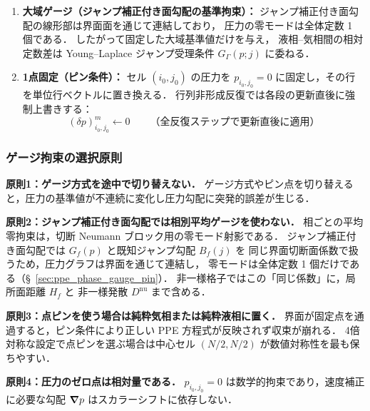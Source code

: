 \begin{enumerate}
  \item \textbf{大域ゲージ（ジャンプ補正付き面勾配の基準拘束）：}
        ジャンプ補正付き面勾配の線形部は界面面を通じて連結しており，
        圧力の零モードは全体定数 1 個である．
        したがって固定した大域基準値だけを与え，
        液相--気相間の相対定数差は Young--Laplace ジャンプ受理条件
        $G_\Gamma(p;j)$ に委ねる．
  \item \textbf{1点固定（ピン条件）：}
        セル $(i_0, j_0)$ の圧力を $p_{i_0,j_0} = 0$ に固定し，その行を単位行ベクトルに置き換える．
        行列非形成反復では各段の更新直後に強制上書きする：
        \begin{equation}
          (\delta p)^m_{i_0, j_0} \leftarrow 0
          \qquad \text{（全反復ステップで更新直後に適用）}
          \label{eq:pin_overwrite}
        \end{equation}
\end{enumerate}

\subsubsection{ゲージ拘束の選択原則}
\label{sec:pinpoint}

\noindent\textbf{原則1：ゲージ方式を途中で切り替えない．}
ゲージ方式やピン点を切り替えると，圧力の基準値が不連続に変化し圧力勾配に突発的誤差が生じる．

\noindent\textbf{原則2：ジャンプ補正付き面勾配では相別平均ゲージを使わない．}
相ごとの平均零拘束は，切断 Neumann ブロック用の零モード射影である．
ジャンプ補正付き面勾配では $G_f(p)$ と既知ジャンプ勾配 $B_f(j)$ を
同じ界面切断面係数で扱うため，圧力グラフは界面を通じて連結し，
零モードは全体定数 1 個だけである（§~\ref{sec:ppe_phase_gauge_pin}）．
非一様格子ではこの「同じ係数」に，局所面距離 $H_f$ と
非一様発散 $D^{\mathrm{nu}}$ まで含める．

\noindent\textbf{原則3：点ピンを使う場合は純粋気相または純粋液相に置く．}
界面が固定点を通過すると，ピン条件により正しい PPE 方程式が反映されず収束が崩れる．
4倍対称な設定で点ピンを選ぶ場合は中心セル $(N/2,N/2)$ が数値対称性を最も保ちやすい．

\noindent\textbf{原則4：圧力のゼロ点は相対量である．}
$p_{i_0,j_0} = 0$ は数学的拘束であり，速度補正に必要な勾配 $\bm{\nabla} p$ はスカラーシフトに依存しない．

\label{sec:fccd_bc_options}%
